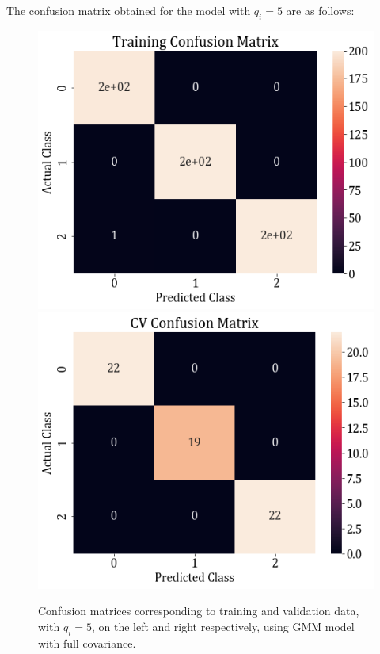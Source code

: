 \documentclass[11pt,a4paper]{article}
\newcommand{\noi}{\noindent}
\begin{document}
\noi
The confusion matrix obtained for the model with $q_i=5$ are as follows:
\begin{figure}[H]
    \includegraphics[scale=0.5]{images/1b_full_train_conf.png}
    \includegraphics[scale=0.5]{images/1b_full_val_conf.png}
    \caption{Confusion matrices corresponding to training and validation data, with $q_i=5$, on the left and right respectively, using GMM model with full covariance.}
\end{figure}
\end{document}
